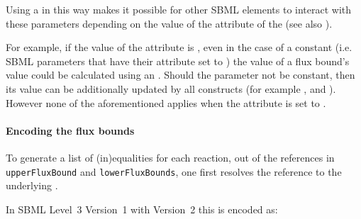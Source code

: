 Using a \Parameter in this way makes it possible for other SBML elements to interact with these parameters depending on the value of the  attribute of the \Model (see also ).

For example, if the value of the  attribute is , even in the case of a constant \Parameter (i.e. SBML parameters that have their  attribute set to ) the value of a flux bound's value could be calculated using an \InitialAssignment. Should the parameter not be constant, then its value can be additionally updated by all \sbmlthreecore constructs (for example \EventAssignment, \AssignmentRule and \AlgebraicRule). However none of the aforementioned applies when the  attribute is set to .


\paragraph{Encoding the flux bounds}
To generate a list of (in)equalities for each reaction, out of the references in \texttt{upperFluxBound} and \texttt{lowerFluxBounds}, one first resolves the reference to the underlying \Parameter. 

In SBML Level~3 Version~1 with \FBC Version~2 this is encoded as:
%

%
%
%

